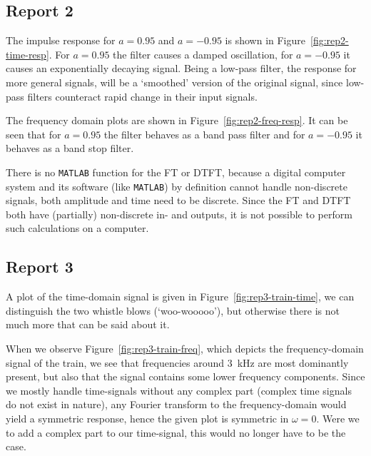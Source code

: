 \documentclass[11pt,titlepage]{report}
\begin{document}

\subsection{Report 2}
The impulse response for $a=0.95$ and $a=-0.95$ is shown in Figure~\ref{fig:rep2-time-resp}. For $a=0.95$ the filter causes a damped oscillation, for $a=-0.95$ it causes an exponentially decaying signal. Being a low-pass filter, the response for more general signals, will be a `smoothed' version of the original signal, since low-pass filters counteract rapid change in their input signals.


The frequency domain plots are shown in Figure~\ref{fig:rep2-freq-resp}. It can be seen that for $a=0.95$ the filter behaves as a band pass filter and for $a=-0.95$ it behaves as a band stop filter. %

There is no \texttt{MATLAB} function for the FT or DTFT, because a digital computer system and its software (like \texttt{MATLAB}) by definition cannot handle non-discrete signals, both amplitude and time need to be discrete. Since the FT and DTFT both have (partially) non-discrete in- and outputs, it is not possible to perform such calculations on a computer.

\subsection{Report 3}


A plot of the time-domain signal is given in Figure~\ref{fig:rep3-train-time}, we can distinguish the two whistle blows (`woo-wooooo'), but otherwise there is not much more that can be said about it.


When we observe Figure~\ref{fig:rep3-train-freq}, which depicts the frequency-domain signal of the train, we see that frequencies around \SI{3}{kHz} are most dominantly present, but also that the signal contains some lower frequency components.
Since we mostly handle time-signals without any complex part (complex time signals do not exist in nature), any Fourier transform to the frequency-domain would yield a symmetric response, hence the given plot is symmetric in $\omega = 0$. Were we to add a complex part to our time-signal, this would no longer have to be the case.
\end{document}
